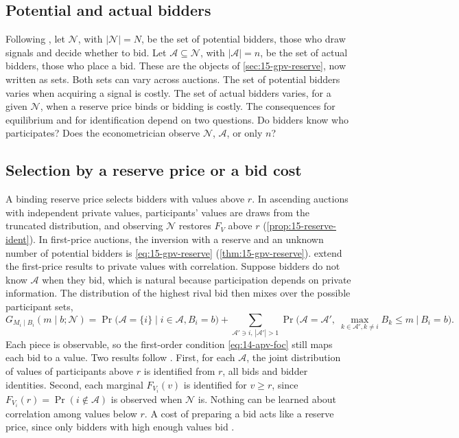 \subsection{Potential and actual bidders}\label{sec:15-entry-sets}

Following \citet[Section 6.3]{AtheyHaile2007}, let $\mathcal N$, with $|\mathcal N|=N$, be the set of
potential bidders, those who draw signals and decide whether to bid. Let
$\mathcal A\subseteq\mathcal N$, with $|\mathcal A|=n$, be the set of actual bidders, those who
place a bid. These are the objects of \cref{sec:15-gpv-reserve}, now written as sets. Both sets can vary across auctions. The set of potential bidders varies when acquiring a
signal is costly. The set of actual bidders varies, for a given $\mathcal N$, when a reserve price
binds or bidding is costly. The consequences for equilibrium and for identification depend on two
questions. Do bidders know who participates? Does the econometrician observe $\mathcal N$, $\mathcal A$,
or only $n$?

\subsection{Selection by a reserve price or a bid cost}\label{sec:15-entry-reserve}

A binding reserve price selects bidders with values above $r$. In ascending auctions with independent
private values, participants' values are draws from the truncated distribution, and observing
$\mathcal N$ restores $F_V$ above $r$ (\cref{prop:15-reserve-ident}). In first-price auctions, the inversion
with a reserve and an unknown number of potential bidders is \eqref{eq:15-gpv-reserve}
(\cref{thm:15-gpv-reserve}). \citet[Section 6.3.1]{AtheyHaile2007} extend the first-price results to
private values with correlation. Suppose bidders do not know $\mathcal A$ when they bid, which is natural
because participation depends on private information. The distribution of the highest rival bid then
mixes over the possible participant sets,
\[
G_{M_i\mid B_i}(m\mid b;\mathcal N)=\Pr\big(\mathcal A=\{i\}\mid i\in\mathcal A,B_i=b\big)+\sum_{\mathcal A'\ni i,\,|\mathcal A'|>1}
\Pr\Big(\mathcal A=\mathcal A',\ \max_{k\in\mathcal A',k\neq i}B_k\le m\ \Big|\ B_i=b\Big).
\]
Each piece is observable, so the first-order condition \eqref{eq:14-apv-foc} still maps each bid to a
value. Two results follow \citep[Theorems 6.4--6.5]{AtheyHaile2007}. First, for each $\mathcal A$, the
joint distribution of values of participants above $r$ is identified from $r$, all bids and bidder
identities. Second, each marginal $F_{V_i}(v)$ is identified for $v\ge r$, since
$F_{V_i}(r)=\Pr(i\notin\mathcal A)$ is observed when $\mathcal N$ is. Nothing can be learned about
correlation among values below $r$. A cost of preparing a bid acts like a reserve price, since only
bidders with high enough values bid \citep[footnote 60, citing \citealp{Samuelson1985} and
\citealp{HaileHongShum2003}]{AtheyHaile2007}.

